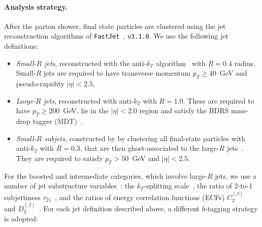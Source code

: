 \documentclass[a4paper,11pt]{article}
\begin{document}
\paragraph{Analysis strategy.}
After the parton shower, final state particles
are clustered using the
jet reconstruction algorithms
of
{\tt FastJet}~\cite{Cacciari:2011ma,Cacciari:2005hq},
{\tt v3.1.0}.
%
We use the following jet definitions:
\begin{itemize}
\item {\it Small-$R$ jets}, reconstructed with the
  anti-$k_T$ algorithm~\cite{Cacciari:2008gp} with $R=0.4$ radius.
  Small-$R$ jets are required
  to have transverse momentum $p_T \ge 40$~GeV
  and pseudo-rapidity $|\eta|<2.5$, 

\item {\it Large-$R$ jets},  reconstructed with 
  anti-$k_T$ with $R=1.0$.
  These are required to have
  $p_T \ge 200$~GeV, lie in the
  $|\eta|<2.0$ region and
  satisfy the  BDRS mass-drop tagger (MDT)~\cite{Butterworth:2008iy}.
    
\item {\it Small-$R$ subjets}, constructed by 
  by clustering all final-state particles with
 anti-$k_T$ with  $R=0.3$, that are then
 ghost-associated  to the large-$R$ jets~\cite{Aad:2015uka}.
 They
  are required to satisfy
  $p_T > 50$~GeV and $|\eta|<2.5$.
\end{itemize}

For the   boosted and intermediate categories,
which involve large-$R$ jets,
we use a number of jet substructure variables~\cite{Salam:2009jx,Aad:2013gja}:
the $k_T$-splitting scale~\cite{Butterworth:2002tt,Butterworth:2008iy}, the ratio of 2-to-1 subjettiness $\tau_{21}$~\cite{Thaler:2010tr,Thaler:2011gf}, and the ratios of energy correlation functions (ECFs)  $C^{(\beta)}_2$~\cite{Larkoski:2013eya} and
$D_2^{(\beta)}$~\cite{Larkoski:2014gra}.
%
For each jet definition described above, a different
$b$-tagging strategy is adopted:
\end{document}
